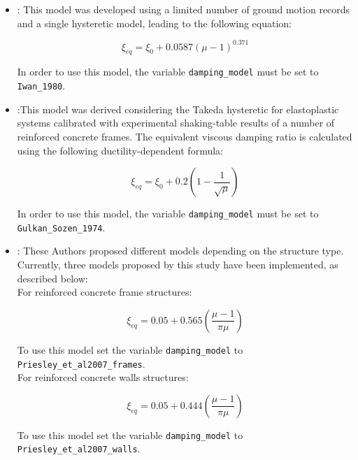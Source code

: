 \begin{itemize}
\item \citep{Iwan1980}: This model was developed using a limited number of ground motion records and a single hysteretic model, leading to the following equation:

\begin{equation}
\xi_{eq} = \xi_0 + 0.0587\left(\mu-1\right)^0.371
\end{equation}

In order to use this model, the variable \verb=damping_model= must be set to \verb=Iwan_1980=.\\

\item \cite{GulkanSozen1974}:This model was derived considering the Takeda hysteretic for elastoplastic systems calibrated with experimental shaking-table results of a number of reinforced concrete frames. The equivalent viscous damping ratio is calculated using the following ductility-dependent formula:

\begin{equation}
\xi_{eq} = \xi_0 + 0.2\left(1- \frac{1}{\sqrt{\mu}}\right)
\end{equation}

In order to use this model, the variable \verb=damping_model= must be set to \verb=Gulkan_Sozen_1974=.\\

\item \cite{PriestleyEtAl2007}: These Authors proposed different models depending on the structure type. Currently, three models proposed by this study have been implemented, as described below: \\

For reinforced concrete frame structures:

\begin{equation}
\xi_{eq} = 0.05 + 0.565\left(\frac{\mu-1}{\pi\mu}\right)
\end{equation}

To use this model set the variable \verb=damping_model= to \verb=Priesley_et_al2007_frames=.\\

For reinforced concrete walls structures:

\begin{equation}
\xi_{eq} = 0.05 + 0.444\left(\frac{\mu-1}{\pi\mu}\right)
\end{equation}

To use this model set the variable \verb=damping_model= to \verb=Priesley_et_al2007_walls=.\\


\end{itemize}
